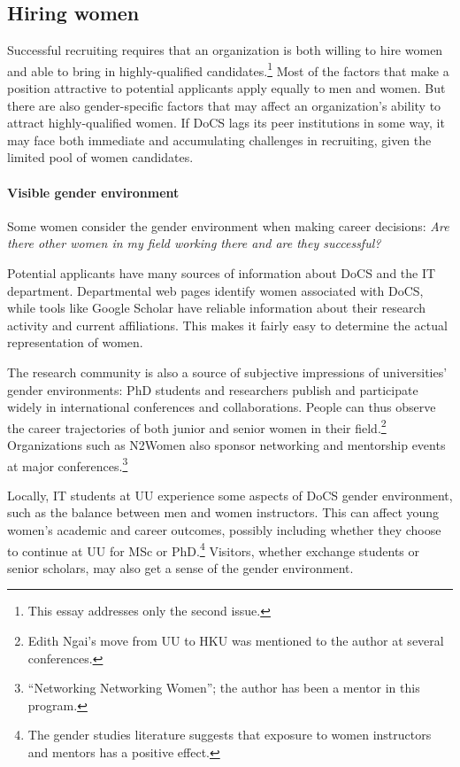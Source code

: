 \documentclass[a4paper,10pt,twocolumn]{article}
\begin{document}
\subsection*{Hiring women}

Successful recruiting requires that an organization is both willing to
hire women and able to bring in highly-qualified
candidates.\footnote{This essay addresses only the second issue.}
Most of the factors that make a position attractive to potential
applicants apply equally to men and women.  But there are also
gender-specific factors that may affect an organization's ability to
attract highly-qualified women.  If DoCS lags its peer institutions in
some way, it may face both immediate and accumulating challenges in
recruiting, given the limited pool of women candidates.

\paragraph{Visible gender environment}
Some women consider the gender environment when making career
decisions: \emph{Are there other women in my field working there and
are they successful?}

Potential applicants have many sources of information about DoCS and
the IT department.  Departmental web pages identify women associated
with DoCS, while tools like Google Scholar have reliable information
about their research activity and current affiliations.  This makes it
fairly easy to determine the actual representation of women.

The research community is also a source of subjective impressions of
universities' gender environments: PhD students and researchers
publish and participate widely in international conferences and
collaborations.  People can thus observe the career trajectories of
both junior and senior women in their field.\footnote{Edith Ngai's
move from UU to HKU was mentioned to the author at several
conferences.}  Organizations such as N2Women also sponsor networking
and mentorship events at major conferences.\footnote{``Networking
Networking Women''; the author has been a mentor in this program.}

Locally, IT students at UU experience some aspects of DoCS gender
environment, such as the balance between men and women instructors.
This can affect young women's academic and career outcomes, possibly
including whether they choose to continue at UU for MSc or
PhD.\footnote{The gender studies literature suggests that exposure to
women instructors and mentors has a positive effect.}  Visitors,
whether exchange students or senior scholars, may also get a sense of
the gender environment.
\end{document}
